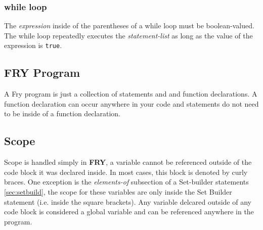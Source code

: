 \documentclass{article}
\begin{document}
\subsubsection{while loop}

The \emph{expression} inside of the parentheses of a while loop must be boolean-valued. The while loop repeatedly executes the \emph{statement-list} as long as the value of the expression is \texttt{true}.

\subsection{FRY Program}

A Fry program is just a collection of statements and and function declarations. A function declaration can occur anywhere in your code and statements do not need to be inside of a function declaration.


\subsection{Scope}
Scope is handled simply in \textbf{FRY}, a variable cannot be referenced outside of the code block it was declared inside. In most cases, this block is denoted by curly braces. One exception is the \emph{elements-of} subsection of a Set-builder statements \ref{sec:setbuild}, the scope for these variables are only inside the Set Builder statement (i.e. inside the square brackets). Any variable delcared outside of any code block is considered a global variable and can be referenced anywhere in the program.
\end{document}
